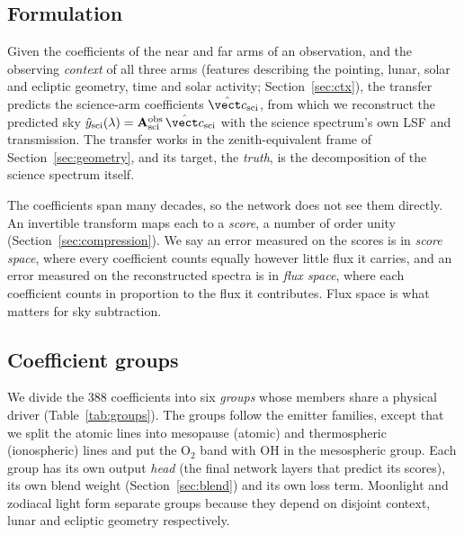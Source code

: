 \subsection{Formulation}

Given the coefficients of the near and far arms of an observation, and the
observing \emph{context} of all three arms (features describing the
pointing, lunar, solar and ecliptic geometry, time and solar activity;
Section~\ref{sec:ctx}), the transfer predicts the science-arm coefficients
$\hat{\vect c}_{\rm sci}$, from which we reconstruct the predicted sky
$\hat y_{\rm sci}(\lambda) = \mathbf{A}^{\rm obs}_{\rm sci}\,\hat{\vect c}_{\rm sci}$
with the science spectrum's own LSF and transmission. The transfer works in
the zenith-equivalent frame of Section~\ref{sec:geometry}, and its target,
the \emph{truth}, is the decomposition of the science spectrum itself.

The coefficients span many decades, so the network does not see them
directly. An invertible transform maps each to a \emph{score}, a number of
order unity (Section~\ref{sec:compression}). We say an error measured on the
scores is in \emph{score space}, where every coefficient counts equally
however little flux it carries, and an error measured on the reconstructed
spectra is in \emph{flux space}, where each coefficient counts in proportion
to the flux it contributes. Flux space is what matters for sky subtraction.

\subsection{Coefficient groups}

We divide the 388 coefficients into six \emph{groups} whose members share a
physical driver (Table~\ref{tab:groups}). The groups follow the emitter
families, except that we split the atomic lines into mesopause (atomic) and
thermospheric (ionospheric) lines and put the O$_2$ band with OH in the
mesospheric group. Each group has its own output \emph{head} (the final
network layers that predict its scores), its own blend weight
(Section~\ref{sec:blend}) and its own loss term. Moonlight and zodiacal
light form separate groups because they depend on disjoint context, lunar
and ecliptic geometry respectively.

